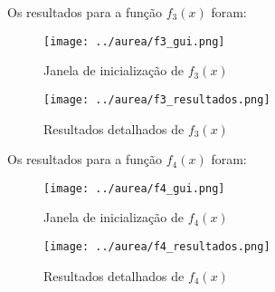 Os resultados para a função $ f_3(x) $ foram:

\begin{figure}[h]
	\begin{center}
		\texttt{[image: ../aurea/f3\_gui.png]}   
		\caption{Janela de inicialização de $ f_3(x) $}
		\label{fig:f3_gui}
	\end{center}
\end{figure}

\begin{figure}[h!]
	\begin{center}
		\texttt{[image: ../aurea/f3\_resultados.png]}   
		\caption{Resultados detalhados de $ f_3(x) $}
		\label{fig:f3_resultados}
	\end{center}
\end{figure}

Os resultados para a função $ f_4(x) $ foram:

\begin{figure}[h]
	\begin{center}
		\texttt{[image: ../aurea/f4\_gui.png]}   
		\caption{Janela de inicialização de $ f_4(x) $}
		\label{fig:f4_gui}
	\end{center}
\end{figure}

\begin{figure}[h!]
	\begin{center}
		\texttt{[image: ../aurea/f4\_resultados.png]}   
		\caption{Resultados detalhados de $ f_4(x) $}
		\label{fig:f4_resultados}
	\end{center}
\end{figure}
